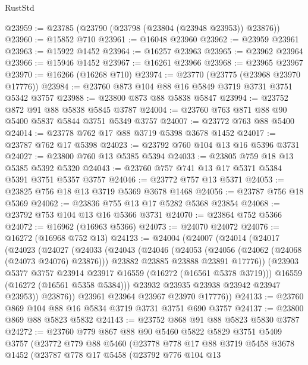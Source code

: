 \begin{lexlean}{RustStd}
\begin{coremodule}
@23959 := @23785 (@23790 (@23798 (@23804 (@23948 @23953)) @23876))
@23960 := @15852 @710
@23961 := @16048 @23960
@23962 := @23959 @23961
@23963 := @15922 @1452
@23964 := @16257 @23963
@23965 := @23962 @23964
@23966 := @15946 @1452
@23967 := @16261 @23966
@23968 := @23965 @23967
@23970 := @16266 (@16268 @710)
@23974 := @23770 (@23775 (@23968 @23970 @17776))
@23984 := @23760 @873 @104 @88 @16 @5849 @3719 @3731 @3751 @5342 @3757
@23988 := @23800 @873 @88 @5838 @5847
@23994 := @23752 @872 @91 @88 @5838 @5845 @3787
@24004 := @23760 @763 @871 @88 @90 @5400 @5837 @5844 @3751 @5349 @3757
@24007 := @23772 @763 @88 @5400
@24014 := @23778 @762 @17 @88 @3719 @5398 @3678 @1452
@24017 := @23787 @762 @17 @5398
@24023 := @23792 @760 @104 @13 @16 @5396 @3731
@24027 := @23800 @760 @13 @5385 @5394
@24033 := @23805 @759 @18 @13 @5385 @5392 @5320
@24043 := @23760 @757 @741 @13 @17 @5371 @5384 @5391 @3751 @5357 @3757
@24046 := @23772 @757 @13 @5371
@24053 := @23825 @756 @18 @13 @3719 @5369 @3678 @1468
@24056 := @23787 @756 @18 @5369
@24062 := @23836 @755 @13 @17 @5282 @5368 @23854
@24068 := @23792 @753 @104 @13 @16 @5366 @3731
@24070 := @23864 @752 @5366
@24072 := @16962 (@16963 @5366)
@24073 := @24070 @24072
@24076 := @16272 (@16968 @752 @13)
@24123 := @24004
    (@24007
      (@24014
        (@24017
          (@24023
            (@24027
              (@24033
                (@24043
                  (@24046
                    (@24053
                      (@24056 (@24062 (@24068 (@24073 @24076) @23876)))
                      @23882
                      @23885
                      @23888
                      @23891
                      @17776))
                  (@23903 @5377 @3757 @23914 @23917 @16559 (@16272 (@16561 @5378 @3719)))
                  @16559
                  (@16272 (@16561 @5358 @5384)))
                @23932
                @23935
                @23938
                @23942
                @23947
                @23953))
            @23876))
        @23961
        @23964
        @23967
        @23970
        @17776))
@24133 := @23760 @869 @104 @88 @16 @5834 @3719 @3731 @3751 @690 @3757
@24137 := @23800 @869 @88 @5823 @5832
@24143 := @23752 @868 @91 @88 @5823 @5830 @3787
@24272 := @23760
    @779
    @867
    @88
    @90
    @5460
    @5822
    @5829
    @3751
    @5409
    @3757
    (@23772
      @779
      @88
      @5460
      (@23778
        @778
        @17
        @88
        @3719
        @5458
        @3678
        @1452
        (@23787
          @778
          @17
          @5458
          (@23792
            @776
            @104
            @13

\end{coremodule}
\end{lexlean}
